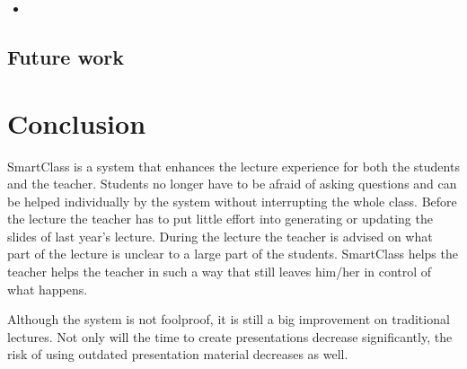 \documentclass[11pt]{article}
\begin{document}
\begin{itemize}
\item 
\end{itemize}

\subsection{Future work}

\section{Conclusion}
SmartClass is a system that enhances the lecture experience for both the students and the teacher. Students no longer have to be afraid of asking questions and can be helped individually by the system without interrupting the whole class. Before the lecture the teacher has to put little effort into generating or updating the slides of last year's lecture. During the lecture the teacher is advised on what part of the lecture is unclear to a large part of the students. SmartClass helps the teacher helps the teacher in such a way that still leaves him/her in control of what happens. 

Although the system is not foolproof, it is still a big improvement on traditional lectures. Not only will the time to create presentations decrease significantly, the risk of using outdated presentation material decreases as well. 
\end{document}
